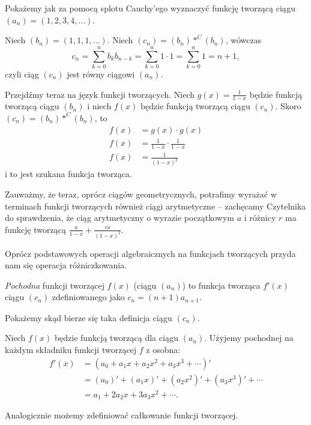 \documentclass[shortabstract]{imthesis}
\begin{document}
\begin{example} \label{example:1234Cauchy}
    Pokażemy jak za pomocą splotu Cauchy'ego wyznaczyć funkcję tworzącą ciągu $(a_n) = (1, 2, 3, 4, \ldots)$.
    
    Niech $(b_n) = (1, 1, 1, \ldots)$. Niech $(c_n) = (b_n) *^C (b_n)$, wówczas 
    $$
    c_n = \sum_{k=0}^n b_k b_{n-k} = \sum_{k=0}^n 1 \cdot 1 = \sum_{k=0}^n 1 = n+1,
    $$
    czyli ciąg $(c_n)$ jest równy ciągowi $(a_n)$.
    
    Przejdźmy teraz na język funkcji tworzących. Niech $g(x) = \frac{1}{1-x}$ będzie funkcją tworzącą ciągu $(b_n)$ i niech $f(x)$ będzie funkcją tworzącą ciągu $(c_n)$. Skoro $(c_n) = (b_n) *^C (b_n)$, to
    \begin{align*}
    f(x) &= g(x) \cdot g(x) \\
    f(x) &= \frac{1}{1-x} \cdot \frac{1}{1-x} \\
    f(x) &= \frac{1}{(1-x)^2}
    \end{align*}
    i to jest szukana funkcja tworząca.

    Zauważmy, że teraz, oprócz ciągów geometrycznych, potrafimy wyrażać w terminach funkcji tworzących również ciągi arytmetyczne -- zachęcamy Czytelnika do sprawdzenia, że ciąg arytmetyczny o wyrazie początkowym $a$ i różnicy $r$ ma funkcję tworzącą $\frac{a}{1-x} + \frac{rx}{(1-x)^2}$.
\end{example}

Oprócz podstawowych operacji algebraicznych na funkcjach tworzących przyda nam się operacja różniczkowania.

\begin{definition}
    \emph{Pochodna} funkcji tworzącej $f(x)$ (ciągu $(a_n)$) to funkcja tworząca $f'(x)$ ciągu $(c_n)$ zdefiniowanego jako $c_n = (n+1)a_{n+1}$.
\end{definition}

Pokażemy skąd bierze się taka definicja ciągu $(c_n)$.

Niech $f(x)$ będzie funkcją tworzącą dla ciągu $(a_n)$. Użyjemy pochodnej na każdym składniku funkcji tworzącej $f$ z osobna:
\begin{align*}
    f'(x) &= (a_0 + a_1x + a_2x^2 + a_3x^3 + \cdots)' \\
    &= (a_0)' + (a_1x)' + (a_2x^2)' + (a_3x^3)' + \cdots \\
    &= a_1 + 2a_2x + 3a_3x^2 + \cdots.
\end{align*}

Analogicznie możemy zdefiniować całkowanie funkcji tworzącej. 
\end{document}
